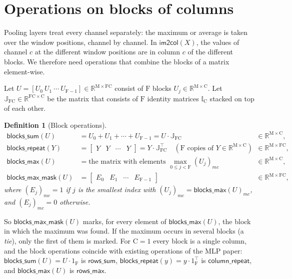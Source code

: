 \documentclass[twoside,11pt]{article}
\newtheorem{definition}{Definition}
\newcommand{\const}[1]{\ensuremath{\mathrm{#1}}} %
\newcommand{\func}[1]{\ensuremath{\textsf{#1}}}  %
\newcommand{\Reals}{\mathbb{R}}
\newcommand{\Fs}{\const{F}}          %
\newcommand{\im}{\func{im2col}}
\newcommand{\bsum}{\func{blocks\_sum}}
\newcommand{\brep}{\func{blocks\_repeat}}
\newcommand{\bmax}{\func{blocks\_max}}
\newcommand{\bmask}{\func{blocks\_max\_mask}}
\newcommand{\Jm}{\mathbb{J}}         %
\begin{document}
\section{Operations on blocks of columns} \label{section:blocks}

Pooling layers treat every channel separately: the maximum or average is taken over the window positions, channel by channel.
In $\im(X)$, the values of channel $c$ at the different window positions are in column $c$ of the different blocks.
We therefore need operations that combine the blocks of a matrix element-wise.

Let $U = [U_0 \ U_1 \ \cdots \ U_{\Fs-1}] \in \Reals^{\const{M} \times \Fs\const{C}}$ consist of $\Fs$ blocks $U_j \in \Reals^{\const{M} \times \const{C}}$.
Let $\Jm_{\Fs\const{C}} \in \Reals^{\Fs\const{C} \times \const{C}}$ be the matrix that consists of $\Fs$ identity matrices $\mathbb{I}_\const{C}$ stacked on top of each other.

\begin{definition}[Block operations] \label{def:blocks}
\begin{align*}
\bsum(U) &= U_0 + U_1 + \cdots + U_{\Fs-1} = U \cdot \Jm_{\Fs\const{C}} &&\in \Reals^{\const{M} \times \const{C}}, \\
\brep(Y) &= \begin{bmatrix} Y & Y & \cdots & Y \end{bmatrix} = Y \cdot \Jm_{\Fs\const{C}}^\top \quad (\Fs \text{ copies of } Y \in \Reals^{\const{M} \times \const{C}}) &&\in \Reals^{\const{M} \times \Fs\const{C}}, \\
\bmax(U) &= \text{the matrix with elements } \max_{0 \leq j < \Fs} (U_j)_{mc} &&\in \Reals^{\const{M} \times \const{C}}, \\
\bmask(U) &= \begin{bmatrix} E_0 & E_1 & \cdots & E_{\Fs-1} \end{bmatrix} &&\in \Reals^{\const{M} \times \Fs\const{C}},
\end{align*}
where $(E_j)_{mc} = 1$ if $j$ is the \emph{smallest} index with $(U_j)_{mc} = \bmax(U)_{mc}$, and $(E_j)_{mc} = 0$ otherwise.
\end{definition}
\noindent
So $\bmask(U)$ marks, for every element of $\bmax(U)$, the block in which the maximum was found.
If the maximum occurs in several blocks (a \emph{tie}), only the first of them is marked.
For $\const{C} = 1$ every block is a single column, and the block operations coincide with existing operations of the MLP paper: $\bsum(U) = U \cdot 1_\Fs$ is \func{rows\_sum}, $\brep(y) = y \cdot 1_\Fs^\top$ is \func{column\_repeat}, and $\bmax(U)$ is \func{rows\_max}.
\end{document}
